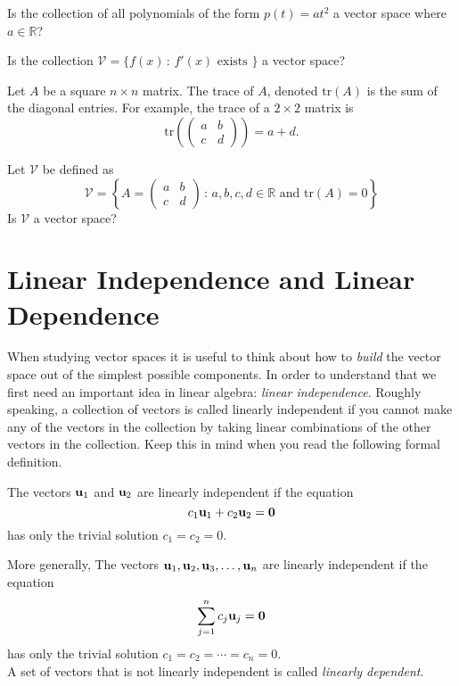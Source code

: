 \begin{problem}
   Is the collection of all polynomials of the form $p(t) = at^2$ a vector space where $a
   \in \mathbb{R}$?
\end{problem}


\begin{problem}
    Is the collection $\mathcal{V} = \{ f(x) \, : \, f'(x) \text{ exists }\}$ a vector
    space?
\end{problem}


\begin{definition}
    Let $A$ be a square $n \times n$ matrix.  The trace of $A$, denoted $\text{tr}(A)$ is
    the sum of the diagonal entries.  For example, the trace of a $2 \times 2$ matrix is
    \[ \text{tr} \left( \begin{pmatrix} a & b \\ c & d \end{pmatrix} \right) = a + d. \]
\end{definition}

\begin{problem}
    Let $\mathcal{V}$ be defined as
    \[ \mathcal{V} = \left\{ A = \begin{pmatrix} a & b \\ c & d \end{pmatrix} \, : \,
    a,b,c,d \in \mathbb{R} \text{ and } \text{tr}(A) = 0 \right\} \]
    Is $\mathcal{V}$ a vector space?
\end{problem}


\section{Linear Independence and Linear Dependence}
When studying vector spaces it is useful to think about how to {\it build} the vector
space out of the simplest possible components.  In order to understand that we first need
an important idea in linear algebra: {\it linear independence}.  Roughly
speaking, a collection of vectors
is called linearly independent if you cannot make any of the vectors in the collection by
taking linear combinations of the other vectors in the collection.  Keep this in mind when
you read the following formal definition.

\begin{definition}
    The vectors ${\bf u}_1$ and ${\bf u}_2$ are linearly independent if the equation 
    \[ c_1 {\bf u}_1 + c_2 {\bf u}_2 = {\bf 0} \]
    has only the trivial solution $c_1 = c_2 = 0$.

    More generally,
    The vectors ${\bf u}_1, {\bf u}_2, {\bf u}_3, \ldots, {\bf u}_n$ are linearly independent if the equation 
    \[ \sum_{j=1}^n c_j {\bf u}_j  = {\bf 0} \]
    has only the trivial solution $c_1 = c_2 = \cdots = c_n = 0$.\\
    A set of vectors that is not linearly independent is called {\it linearly dependent}.
\end{definition}

